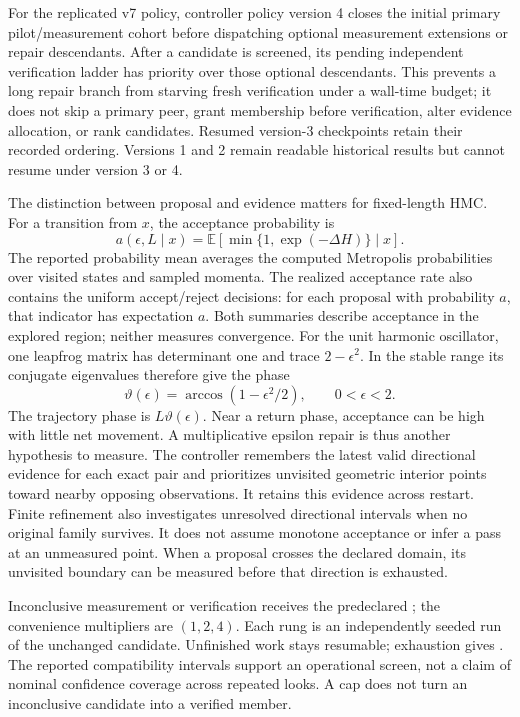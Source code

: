 For the replicated v7 policy, controller policy version 4 closes the initial
primary pilot/measurement cohort before dispatching optional measurement
extensions or repair descendants. After a candidate is screened, its pending
independent verification ladder has priority over those optional descendants.
This prevents a long repair branch from starving fresh verification under a
wall-time budget; it does not skip a primary peer, grant membership before
verification, alter evidence allocation, or rank candidates. Resumed version-3
checkpoints retain their recorded ordering. Versions 1 and 2 remain readable
historical results but cannot resume under version 3 or 4.

The distinction between proposal and evidence matters for fixed-length HMC.
For a transition from $x$, the acceptance probability is
\begin{equation}
 a(\epsilon,L\mid x)
 =\mathbb E\!\left[\min\{1,\exp(-\Delta H)\}\mid x\right].
\end{equation}
The reported probability mean averages the computed Metropolis probabilities
over visited states and sampled momenta. The realized acceptance rate also
contains the uniform accept/reject decisions: for each proposal with
probability $a$, that indicator has expectation $a$. Both summaries describe
acceptance in the explored region; neither measures convergence.
For the unit harmonic oscillator, one leapfrog matrix has determinant one and
trace $2-\epsilon^2$. In the stable range its conjugate eigenvalues therefore
give the phase
\begin{equation}
 \vartheta(\epsilon)=\arccos(1-\epsilon^2/2),\qquad 0<\epsilon<2.
\end{equation}
The trajectory phase is $L\vartheta(\epsilon)$. Near a return phase, acceptance
can be high with little net movement. A multiplicative epsilon repair is thus
another hypothesis to measure. The controller remembers the latest valid
directional evidence for each exact pair and prioritizes unvisited geometric
interior points toward nearby opposing observations. It retains this evidence
across restart. Finite refinement also investigates unresolved directional
intervals when no original family survives. It does not assume monotone
acceptance or infer a pass at an unmeasured point.
When a proposal crosses the declared domain, its unvisited boundary can be
measured before that direction is exhausted.

Inconclusive measurement or verification receives the predeclared
; the convenience multipliers are $(1,2,4)$. Each rung is
an independently seeded run of the unchanged candidate. Unfinished work stays
resumable; exhaustion gives . The reported
compatibility intervals support an operational screen, not a claim of nominal
confidence coverage across repeated looks. A cap does not turn an inconclusive
candidate into a verified member.

